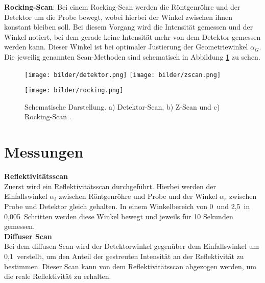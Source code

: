 \textbf{Rocking-Scan}:
Bei einem Rocking-Scan werden die Röntgenröhre und der Detektor um die Probe bewegt, wobei hierbei der Winkel zwischen ihnen konstant bleiben soll. Bei diesem Vorgang wird die Intensität gemessen und der Winkel notiert, bei dem gerade keine Intensität mehr von dem Detektor gemessen werden kann. Dieser Winkel ist bei optimaler Justierung der Geometriewinkel $\alpha_G$.\\

Die jeweilig genannten Scan-Methoden sind schematisch in Abbildung \ref{scan} zu sehen.

\begin{figure}[htbp]
\begin{minipage}[c]{0.45\textwidth}
\texttt{[image: bilder/detektor.png]}
\texttt{[image: bilder/zscan.png]}
\end{minipage}
\begin{minipage}[c]{0.45\textwidth}
\texttt{[image: bilder/rocking.png]}
\end{minipage}
\caption{Schematische Darstellung. a) Detektor-Scan, b) Z-Scan und c) Rocking-Scan \cite{anleitung}.}
\label{scan}
\end{figure}

\section{Messungen}
\textbf{Reflektivitätsscan}\\
Zuerst wird ein Reflektivitätsscan durchgeführt. Hierbei werden der Einfallswinkel $\alpha_i$ zwischen Röntgenröhre und Probe und der Winkel $\alpha_r$ zwischen Probe und Detektor gleich gehalten. In einem Winkelbereich von 0\textdegree\, und 2,5\textdegree\, in 0,005\textdegree\, Schritten werden diese Winkel bewegt und jeweils für 10 Sekunden gemessen.\\

\textbf{Diffuser Scan}\\
Bei dem diffusen Scan wird der Detektorwinkel gegenüber dem Einfallswinkel um 0,1\textdegree\, verstellt, um den Anteil der gestreuten Intensität an der Reflektivität zu bestimmen. Dieser Scan kann von dem Reflektivitätsscan abgezogen werden, um die reale Reflektivität zu erhalten.
